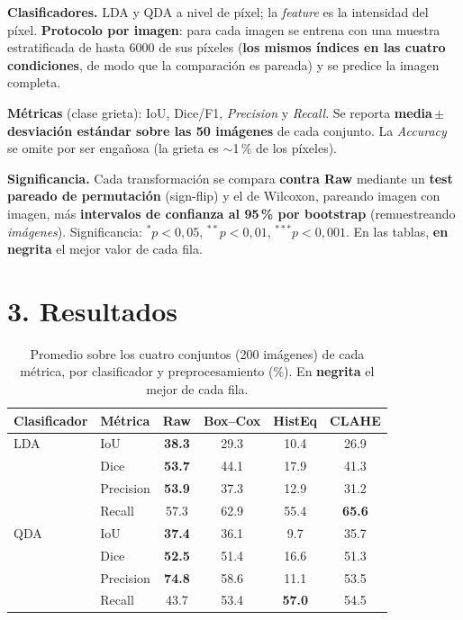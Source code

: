 \documentclass[11pt]{article}
\begin{document}
\textbf{Clasificadores.} LDA y QDA a nivel de p\'ixel; la \emph{feature} es la
intensidad del p\'ixel. \textbf{Protocolo por imagen}: para cada imagen se entrena con
una muestra estratificada de hasta $6000$ de sus p\'ixeles (\textbf{los mismos
\'indices en las cuatro condiciones}, de modo que la comparaci\'on es pareada) y se
predice la imagen completa.

\textbf{M\'etricas} (clase grieta): IoU, Dice/F1, \emph{Precision} y \emph{Recall}.
Se reporta \textbf{media\,$\pm$\,desviaci\'on est\'andar sobre las 50 im\'agenes} de
cada conjunto. La \emph{Accuracy} se omite por ser enga\~nosa (la grieta es
$\sim$1\,\% de los p\'ixeles).

\textbf{Significancia.} Cada transformaci\'on se compara \textbf{contra Raw} mediante
un \textbf{test pareado de permutaci\'on} (sign-flip) y el de Wilcoxon, pareando
imagen con imagen, m\'as \textbf{intervalos de confianza al 95\,\% por bootstrap}
(remuestreando \emph{im\'agenes}). Significancia: $^{*}p<0{,}05$, $^{**}p<0{,}01$,
$^{***}p<0{,}001$. En las tablas, \textbf{en negrita} el mejor valor de cada fila.

\section*{3. Resultados}
\begin{table}[H]\centering\small
\caption{Promedio sobre los cuatro conjuntos (200 im\'agenes) de cada m\'etrica, por clasificador y preprocesamiento (\%). En \textbf{negrita} el mejor de cada fila.}\label{tab:avg}
\begin{tabular}{l l cccc}
\toprule
Clasificador & M\'etrica & Raw & Box--Cox & HistEq & CLAHE \\
\midrule
LDA & IoU & \textbf{38.3} & 29.3 & 10.4 & 26.9 \\
 & Dice & \textbf{53.7} & 44.1 & 17.9 & 41.3 \\
 & Precision & \textbf{53.9} & 37.3 & 12.9 & 31.2 \\
 & Recall & 57.3 & 62.9 & 55.4 & \textbf{65.6} \\
\addlinespace
QDA & IoU & \textbf{37.4} & 36.1 & 9.7 & 35.7 \\
 & Dice & \textbf{52.5} & 51.4 & 16.6 & 51.3 \\
 & Precision & \textbf{74.8} & 58.6 & 11.1 & 53.5 \\
 & Recall & 43.7 & 53.4 & \textbf{57.0} & 54.5 \\
\bottomrule
\end{tabular}
\end{table}
\end{document}
